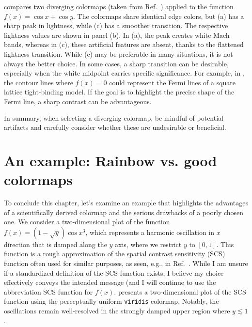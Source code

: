  compares two diverging colormaps (taken from Ref.~\cite{moreland2009}) applied to the function $f(x) = \cos x + \cos y$. The colormaps share identical edge colors, but (a) has a sharp peak in lightness, while (c) has a smoother transition. The respective lightness values are shown in panel (b). In (a), the peak creates white Mach bands, whereas in (c), these artificial features are absent, thanks to the flattened lightness transition.
While (c) may be preferable in many situations, it is not always the better choice. In some cases, a sharp transition can be desirable, especially when the white midpoint carries specific significance. For example, in , the contour lines where $f(x)=0$ could represent the Fermi lines of a square lattice tight-binding model. If the goal is to highlight the precise shape of the Fermi line, a sharp contrast can be advantageous.

In summary, when selecting a diverging colormap, be mindful of potential artifacts and carefully consider whether these are undesirable or beneficial.

\section{An example: Rainbow vs. good colormaps}\label{sec:rainbow}

To conclude this chapter, let's examine an example that highlights the advantages of a scientifically derived colormap and the serious drawbacks of a poorly chosen one. We consider a two-dimensional plot of the function $f(x)= \left(1 - \sqrt{y} \right)  \cos x^3$, which represents a harmonic oscillation in $x$ direction that is damped along the $y$ axis, where we restrict $y$ to $\left[0,1\right]$. This function is a rough approximation of the spatial contrast sensitivity (SCS) function often used for similar purposes, as seen, e.g., in Ref.~\cite{moreland2009}. While I am unsure if a standardized definition of the SCS function exists, I believe my choice effectively conveys the intended message (and I will continue to use the abbreviation SCS function for $f(x)$.
 presents a two-dimensional plot of the SCS function using the perceptually uniform \verb|viridis| colormap.
Notably, the oscillations remain well-resolved in the strongly damped upper region where $y \lesssim 1$.

